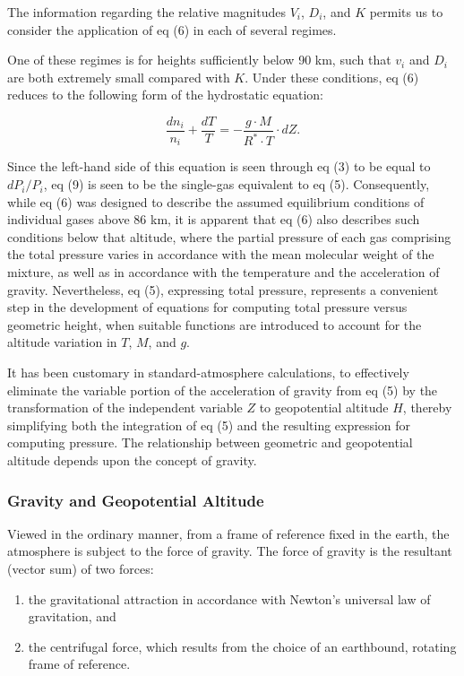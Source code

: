 \documentclass{article}
\begin{document}
The information regarding the relative magnitudes $V_i$, $D_i$, and $K$ permits us to consider the application of eq (6) in each of several regimes.

One of these regimes is for heights sufficiently below 90 km, such that $v_i$ and $D_i$ are both extremely small compared with $K$. Under these conditions, eq (6) reduces to the following form of the hydrostatic equation:

\[
\frac{d n_i}{n_i} + \frac{dT}{T} = -\frac{g \cdot M}{R^* \cdot T} \cdot dZ. \tag{9}
\]

Since the left-hand side of this equation is seen through eq (3) to be equal to $dP_i / P_i$, eq (9) is seen to be the single-gas equivalent to eq (5). Consequently, while eq (6) was designed to describe the assumed equilibrium conditions of individual gases above 86 km, it is apparent that eq (6) also describes such conditions below that altitude, where the partial pressure of each gas comprising the total pressure varies in accordance with the mean molecular weight of the mixture, as well as in accordance with the temperature and the acceleration of gravity. Nevertheless, eq (5), expressing total pressure, represents a convenient step in the development of equations for computing total pressure versus geometric height, when suitable functions are introduced to account for the altitude variation in $T$, $M$, and $g$.

It has been customary in standard-atmosphere calculations, to effectively eliminate the variable portion of the acceleration of gravity from eq (5) by the transformation of the independent variable $Z$ to geopotential altitude $H$, thereby simplifying both the integration of eq (5) and the resulting expression for computing pressure. The relationship between geometric and geopotential altitude depends upon the concept of gravity.

\subsubsection{Gravity and Geopotential Altitude}

Viewed in the ordinary manner, from a frame of reference fixed in the earth, the atmosphere is subject to the force of gravity. The force of gravity is the resultant (vector sum) of two forces:
\begin{enumerate}
    \item the gravitational attraction in accordance with Newton's universal law of gravitation, and
    \item the centrifugal force, which results from the choice of an earthbound, rotating frame of reference.
\end{enumerate}
\end{document}
